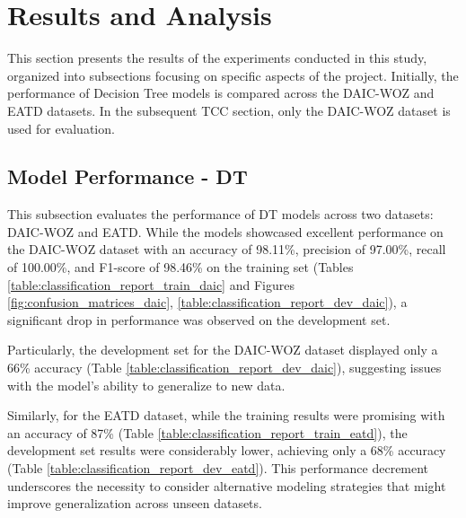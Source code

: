 \section{Results and Analysis}
This section presents the results of the experiments conducted in this study, organized into subsections focusing on specific aspects of the project. Initially, the performance of Decision Tree models is compared across the DAIC-WOZ and EATD datasets. In the subsequent TCC section, only the DAIC-WOZ dataset is used for evaluation.

\subsection{Model Performance - DT}
This subsection evaluates the performance of DT models across two datasets: DAIC-WOZ and EATD. While the models showcased excellent performance on the DAIC-WOZ dataset with an accuracy of 98.11\%, precision of 97.00\%, recall of 100.00\%, and F1-score of 98.46\% on the training set (Tables \ref{table:classification_report_train_daic} and Figures \ref{fig:confusion_matrices_daic}, \ref{table:classification_report_dev_daic}), a significant drop in performance was observed on the development set.

Particularly, the development set for the DAIC-WOZ dataset displayed only a 66\% accuracy (Table \ref{table:classification_report_dev_daic}), suggesting issues with the model's ability to generalize to new data. 

Similarly, for the EATD dataset, while the training results were promising with an accuracy of 87\% (Table \ref{table:classification_report_train_eatd}), the development set results were considerably lower, achieving only a 68\% accuracy (Table \ref{table:classification_report_dev_eatd}). This performance decrement underscores the necessity to consider alternative modeling strategies that might improve generalization across unseen datasets.


\begin{table}[H]
    \centering
    \caption{Classification Report on Training Set - DAIC}
    \label{table:classification_report_train_daic}
\end{table}


